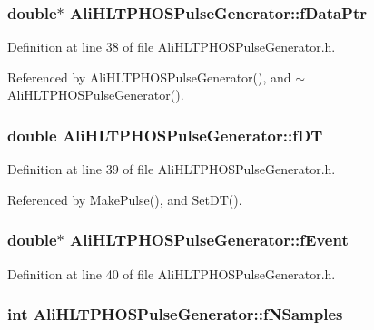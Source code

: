 \subsubsection{\setlength{\rightskip}{0pt plus 5cm}double$\ast$ {\bf Ali\-HLTPHOSPulse\-Generator::f\-Data\-Ptr}\hspace{0.3cm}{\tt  [private]}}\label{classAliHLTPHOSPulseGenerator_r5}




Definition at line 38 of file Ali\-HLTPHOSPulse\-Generator.h.

Referenced by Ali\-HLTPHOSPulse\-Generator(), and $\sim$Ali\-HLTPHOSPulse\-Generator().
\subsubsection{\setlength{\rightskip}{0pt plus 5cm}double {\bf Ali\-HLTPHOSPulse\-Generator::f\-DT}\hspace{0.3cm}{\tt  [private]}}\label{classAliHLTPHOSPulseGenerator_r6}




Definition at line 39 of file Ali\-HLTPHOSPulse\-Generator.h.

Referenced by Make\-Pulse(), and Set\-DT().
\subsubsection{\setlength{\rightskip}{0pt plus 5cm}double$\ast$ {\bf Ali\-HLTPHOSPulse\-Generator::f\-Event}\hspace{0.3cm}{\tt  [private]}}\label{classAliHLTPHOSPulseGenerator_r7}




Definition at line 40 of file Ali\-HLTPHOSPulse\-Generator.h.
\subsubsection{\setlength{\rightskip}{0pt plus 5cm}int {\bf Ali\-HLTPHOSPulse\-Generator::f\-NSamples}\hspace{0.3cm}{\tt  [private]}}\label{classAliHLTPHOSPulseGenerator_r1}




